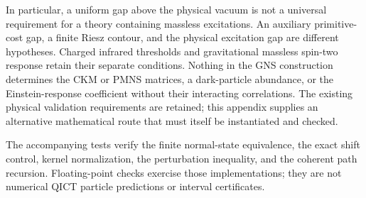 In particular, a uniform gap above the physical vacuum is not a universal
requirement for a theory containing massless excitations. An auxiliary
primitive-cost gap, a finite Riesz contour, and the physical excitation gap
are different hypotheses. Charged infrared thresholds and gravitational
massless spin-two response retain their separate conditions. Nothing in the
GNS construction determines the CKM or PMNS matrices, a dark-particle
abundance, or the Einstein-response coefficient without their interacting
correlations. The existing physical validation requirements are retained;
this appendix supplies an alternative mathematical route that must itself
be instantiated and checked.

The accompanying tests verify the finite normal-state equivalence, the exact
shift control, kernel normalization, the perturbation inequality, and the
coherent path recursion. Floating-point checks exercise those implementations;
they are not numerical QICT particle predictions or interval certificates.
